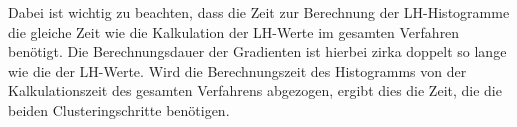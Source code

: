 Dabei ist wichtig zu beachten, dass die Zeit zur Berechnung der LH-Histogramme die gleiche Zeit wie die Kalkulation der LH-Werte im gesamten Verfahren benötigt. Die Berechnungsdauer der Gradienten ist hierbei zirka doppelt so lange wie die der LH-Werte. Wird die Berechnungszeit des Histogramms von der Kalkulationszeit des gesamten Verfahrens abgezogen, ergibt dies die Zeit, die die beiden Clusteringschritte benötigen.

\begin{table}[h]
\centering
{}
\caption{Überblick über die Berechnungsraten der verschiedenen Volumengrößen}
\label{tab:ueberblick_rate}
\end{table}



